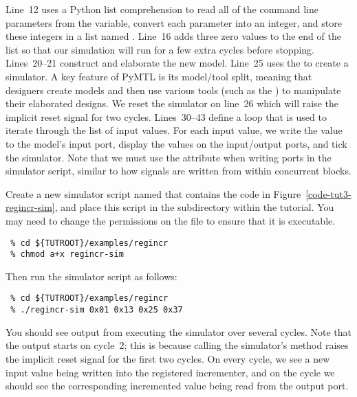 \documentclass{cbxdoc}
\begin{document}


Line~12 uses a Python list comprehension to read all of the command line
parameters from the  variable, convert each parameter into an
integer, and store these integers in a list named .
Line~16 adds three zero values to the end of the list so that our
simulation will run for a few extra cycles before stopping. Lines~20--21
construct and elaborate the new  model. Line~25 uses the
 to create a simulator. A key feature of PyMTL is its
model/tool split, meaning that designers create models and then use
various tools (such as the ) to manipulate their
elaborated designs. We reset the simulator on line~26 which will raise
the implicit reset signal for two cycles. Lines~30--43 define a loop that
is used to iterate through the list of input values. For each input
value, we write the value to the model's input port, display the values
on the input/output ports, and tick the simulator. Note that we must use
the  attribute when writing ports in the simulator script,
similar to how signals are written from within 
concurrent blocks.

Create a new simulator script named  that contains the
code in Figure~\ref{code-tut3-regincr-sim}, and place this script in the
 subdirectory within the tutorial. You may need to
change the permissions on the file to ensure that it is executable.

\begin{verbatim}
 % cd ${TUTROOT}/examples/regincr
 % chmod a+x regincr-sim
\end{verbatim}

Then run the simulator script as follows:

\begin{verbatim}
 % cd ${TUTROOT}/examples/regincr
 % ./regincr-sim 0x01 0x13 0x25 0x37
\end{verbatim}

You should see output from executing the simulator over several cycles.
Note that the output starts on cycle~2; this is because calling the
simulator's  method raises the implicit reset signal for the
first two cycles. On every cycle, we see a new input value being written
into the registered incrementer, and on the  cycle we should see
the corresponding incremented value being read from the output port.

\newpage
\end{document}
